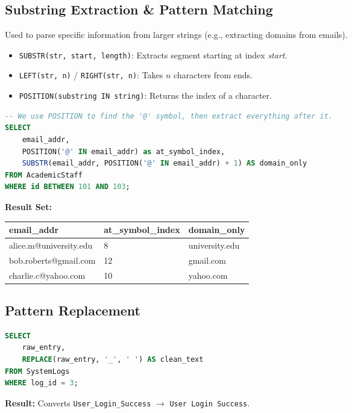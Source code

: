 \documentclass[12pt,a4paper]{article}
\begin{document}
\subsection{Substring Extraction \& Pattern Matching}
Used to parse specific information from larger strings (e.g., extracting domains from emails).
\begin{itemize}
    \item \texttt{SUBSTR(str, start, length)}: Extracts segment starting at index \textit{start}.
    \item \texttt{LEFT(str, n)} / \texttt{RIGHT(str, n)}: Takes $n$ characters from ends.
    \item \texttt{POSITION(substring IN string)}: Returns the index of a character.
\end{itemize}

\begin{lstlisting}[language=SQL, caption=Dynamic Domain Extraction]
-- We use POSITION to find the '@' symbol, then extract everything after it.
SELECT 
    email_addr,
    POSITION('@' IN email_addr) as at_symbol_index,
    SUBSTR(email_addr, POSITION('@' IN email_addr) + 1) AS domain_only
FROM AcademicStaff 
WHERE id BETWEEN 101 AND 103;
\end{lstlisting}

\textbf{Result Set:}
\begin{table}[H]
\centering
\begin{tabular}{@{}lll@{}}
\toprule
\textbf{email\_addr} & \textbf{at\_symbol\_index} & \textbf{domain\_only} \\ \midrule
alice.m@university.edu & 8 & university.edu \\
bob.roberts@gmail.com & 12 & gmail.com \\
charlie.c@yahoo.com & 10 & yahoo.com \\ \bottomrule
\end{tabular}
\end{table}

\subsection{Pattern Replacement}
\begin{lstlisting}[language=SQL]
SELECT 
    raw_entry, 
    REPLACE(raw_entry, '_', ' ') AS clean_text
FROM SystemLogs
WHERE log_id = 3;
\end{lstlisting}
\textbf{Result:} Converts \texttt{User\_Login\_Success} $\rightarrow$ \texttt{User Login Success}.

\newpage
\end{document}

